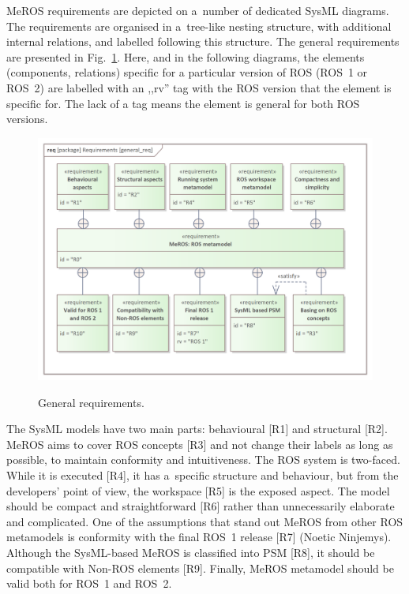 \documentclass[11pt,oneside,a4paper]{article}
\begin{document}
	\pagebreak
	
	
	MeROS requirements are depicted on a~number of dedicated SysML diagrams. The requirements are organised in a~tree-like nesting structure, with additional internal relations, and labelled following this structure. The general requirements are presented in Fig.~\ref{fig:general_req}. Here, and in the following diagrams, the elements (components, relations) specific for a particular version of ROS (ROS~1 or ROS~2) are labelled with an ,,rv''  tag with the ROS version that the element is specific for. The lack of a tag means the element is general for both ROS versions.
	
	\begin{figure}[H]
		\centering
		\begin{center}
			{\includegraphics[scale=1.0]{img/requirement_pkg/general_req.png}}
		\end{center}
		\caption{General requirements.} 
		\label{fig:general_req}
	\end{figure}
	
	
	The SysML models have two main parts: behavioural [R1] and structural [R2]. MeROS aims to cover ROS concepts [R3] and not change their labels as long as possible, to maintain conformity and intuitiveness. The ROS system is two-faced. While it is executed [R4], it has a~specific structure and behaviour, but from the developers' point of view, the workspace [R5] is the exposed aspect. The model should be compact and straightforward [R6] rather than unnecessarily elaborate and complicated. One of the assumptions that stand out MeROS from other ROS metamodels is conformity with the final ROS~1 release [R7] (Noetic Ninjemys). Although the SysML-based MeROS is classified into PSM [R8], it should be compatible with Non-ROS elements [R9]. Finally, MeROS metamodel should be valid both for ROS~1 and ROS~2.
	
\end{document}
